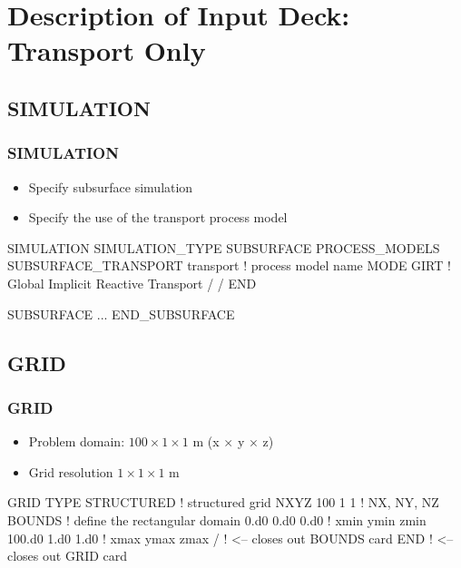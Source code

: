 \documentclass{beamer}
\newcommand\bluecomment[1]{{{\color{blue} #1}}}
\begin{document}
\section{Description of Input Deck: Transport Only}


\subsection{SIMULATION}

\begin{frame}[fragile]\frametitle{SIMULATION}

\begin{itemize}
  \item Specify subsurface simulation
  \item Specify the use of the transport process model
\end{itemize}


\begin{semiverbatim}

SIMULATION
  SIMULATION_TYPE SUBSURFACE
  PROCESS_MODELS
    SUBSURFACE_TRANSPORT transport \bluecomment{! process model name}
      MODE GIRT   \bluecomment{! Global Implicit Reactive Transport}
    /
  /
END

SUBSURFACE
  ...
END_SUBSURFACE
\end{semiverbatim}

\end{frame}

\subsection{GRID}
\begin{frame}\frametitle{GRID}

\begin{itemize}
  \item Problem domain: $100 \times 1 \times 1$ m (x $\times$ y $\times$ z)
  \item Grid resolution $1 \times 1 \times 1$ m
\end{itemize}

\begin{semiverbatim}
GRID
  TYPE STRUCTURED     \bluecomment{! structured grid}
  NXYZ 100 1 1        \bluecomment{! NX, NY, NZ}
  BOUNDS              \bluecomment{! define the rectangular domain}
    0.d0 0.d0 0.d0    \bluecomment{! xmin ymin zmin}
    100.d0 1.d0 1.d0  \bluecomment{! xmax ymax zmax}
  /  \bluecomment{! <-- closes out BOUNDS card}
END  \bluecomment{! <-- closes out GRID card}
\end{semiverbatim}

\end{frame}
\end{document}
